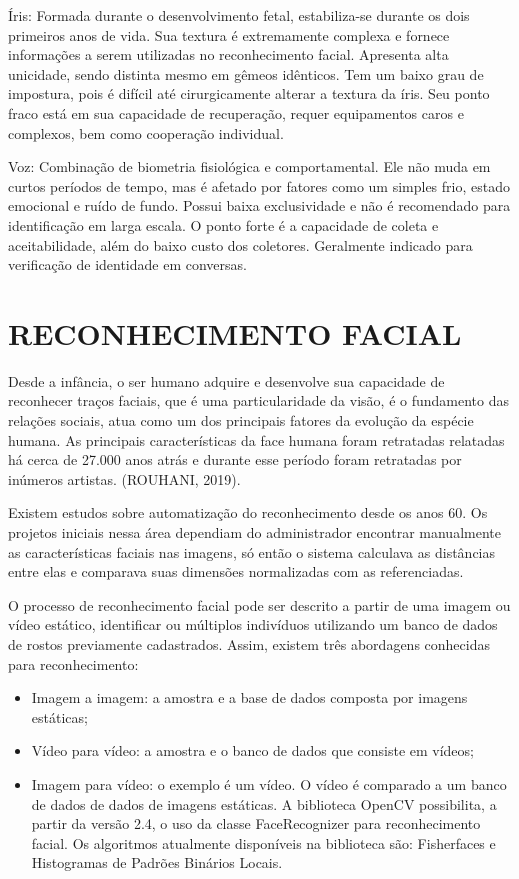 Íris: Formada durante o desenvolvimento fetal, estabiliza-se durante os dois primeiros anos de 
vida. Sua textura é extremamente complexa e fornece informações a serem utilizadas no reconhecimento 
facial. Apresenta alta unicidade, sendo distinta mesmo em gêmeos idênticos. Tem um baixo grau de 
impostura, pois é difícil até cirurgicamente alterar a textura da íris. Seu ponto fraco está em sua 
capacidade de recuperação, requer equipamentos caros e complexos, bem como cooperação individual.

Voz: Combinação de biometria fisiológica e comportamental. Ele não muda em curtos períodos de tempo, 
mas é afetado por fatores como um simples frio, estado emocional e ruído de fundo. Possui baixa 
exclusividade e não é recomendado para identificação em larga escala. O ponto forte é a capacidade 
de coleta e aceitabilidade, além do baixo custo dos coletores. Geralmente indicado para verificação 
de identidade em conversas.

\section{RECONHECIMENTO FACIAL}\label{sec:formatacaoTexto}

Desde a infância, o ser humano adquire e desenvolve sua capacidade de reconhecer traços faciais, 
que é uma particularidade da visão, é o fundamento das relações sociais, atua como um dos principais 
fatores da evolução da espécie humana. As principais características da face humana foram retratadas 
relatadas há cerca de 27.000 anos atrás e durante esse período foram retratadas por inúmeros 
artistas. (ROUHANI, 2019).

Existem estudos sobre automatização do reconhecimento desde os anos 60. Os projetos iniciais nessa 
área dependiam do administrador encontrar manualmente as características faciais nas imagens, só 
então o sistema calculava as distâncias entre elas e comparava suas dimensões normalizadas com 
as referenciadas.

O processo de reconhecimento facial pode ser descrito a partir de uma imagem ou vídeo estático, 
identificar ou múltiplos indivíduos utilizando um banco de dados de rostos previamente cadastrados.
 Assim, existem três abordagens conhecidas para reconhecimento:

\begin{itemize}
    \item Imagem a imagem: a amostra e a base de dados composta por imagens estáticas;

    \item Vídeo para vídeo: a amostra e o banco de dados que consiste em vídeos;

    \item Imagem para vídeo: o exemplo é um vídeo. O vídeo é comparado a um banco de dados de 
    dados de imagens estáticas. A biblioteca OpenCV possibilita, a partir da versão 2.4, o 
    uso da classe FaceRecognizer para reconhecimento facial. Os algoritmos atualmente disponíveis 
    na biblioteca são: Fisherfaces e Histogramas de Padrões Binários Locais.
\end{itemize}